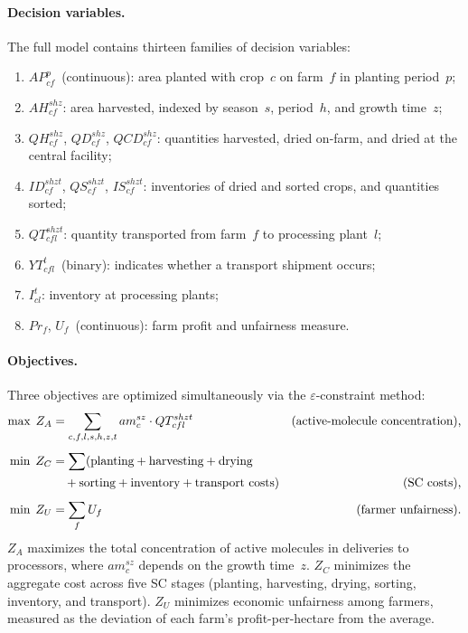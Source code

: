 \documentclass{oqireport}
\begin{document}
\paragraph{Decision variables.}
The full model contains thirteen families of decision variables:
\begin{enumerate}
    \item $AP^{p}_{cf}$~(continuous): area planted with crop~$c$ on farm~$f$ in planting period~$p$;
    \item $AH^{shz}_{cf}$: area harvested, indexed by season~$s$, period~$h$, and growth time~$z$;
    \item $QH^{shz}_{cf}$, $QD^{shz}_{cf}$, $QCD^{shz}_{cf}$: quantities harvested, dried on-farm, and dried at the central facility;
    \item $ID^{shzt}_{cf}$, $QS^{shzt}_{cf}$, $IS^{shzt}_{cf}$: inventories of dried and sorted crops, and quantities sorted;
    \item $QT^{shzt}_{cfl}$: quantity transported from farm~$f$ to processing plant~$l$;
    \item $YT^{t}_{cfl}$~(binary): indicates whether a transport shipment occurs;
    \item $I^{t}_{cl}$: inventory at processing plants;
    \item $Pr_f$, $U_f$~(continuous): farm profit and unfairness measure.
\end{enumerate}

\paragraph{Objectives.}
Three objectives are optimized simultaneously via the $\varepsilon$-constraint method:
\begin{align}
    \max\; Z_A &= \sum_{c,f,l,s,h,z,t} am^{sz}_{c}\cdot QT^{shzt}_{cfl}
        & \text{(active-molecule concentration),} \label{eq:esteso_ZA}\\[4pt]
    \min\; Z_C &= \sum (\text{planting} + \text{harvesting} + \text{drying} \notag\\
               &\quad + \text{sorting} + \text{inventory} + \text{transport costs})
        & \text{(SC costs),} \label{eq:esteso_ZC}\\[4pt]
    \min\; Z_U &= \sum_f U_f
        & \text{(farmer unfairness).} \label{eq:esteso_ZU}
\end{align}
$Z_A$ maximizes the total concentration of active molecules in deliveries to processors, where $am^{sz}_c$ depends on the growth time~$z$. $Z_C$ minimizes the aggregate cost across five SC stages (planting, harvesting, drying, sorting, inventory, and transport). $Z_U$ minimizes economic unfairness among farmers, measured as the deviation of each farm's profit-per-hectare from the average.
\end{document}
